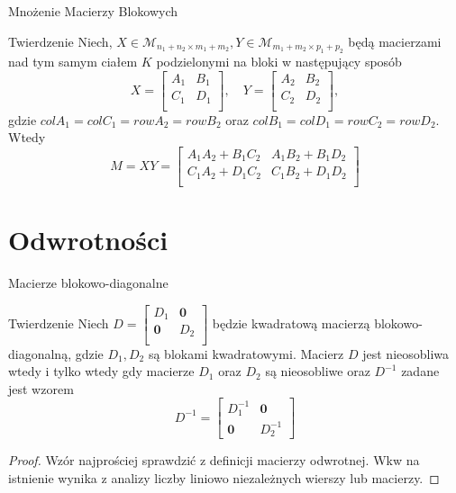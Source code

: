 \documentclass{beamer}
\newcommand{\zero}{\mathbf{0}}
\begin{document}
\begin{frame}{Mnożenie Macierzy Blokowych}
    \begin{block}{Twierdzenie}
        Niech, $X \in \mathcal{M}_{n_1 + n_2 \times m_1 + m_2},Y \in \mathcal{M}_{m_1 + m_2 \times p_1 + p_2}$ będą macierzami nad tym samym ciałem $K$ podzielonymi na bloki w następujący sposób
        $$X =\begin{bmatrix}
            A_1 & B_1 \\ C_1 & D_1 \\
        \end{bmatrix}, \quad Y = \begin{bmatrix}
            A_2 & B_2 \\ C_2 & D_2 \\ 
        \end{bmatrix},$$  gdzie $col A_1 = col C_1 = row A_2 = row B_2$ oraz $col B_1 = col D_1 = row C_2 = row D_2 .$
        \newline 
        Wtedy 
        $$ M = XY = \begin{bmatrix}
            A_1 A_2 +  B_1 C_2 & A_1 B_2 + B_1 D_2 \\
            C_1 A_2 + D_1 C_2 & C_1 B_2 + D_1 D_2 \\
        \end{bmatrix}$$
    \end{block}
\end{frame}

\section{Odwrotności}

\begin{frame}{Macierze blokowo-diagonalne}
    \begin{block}{Twierdzenie}
        Niech $D = \begin{bmatrix}
            D_1 & \zero \\ \zero & D_2 \\ 
        \end{bmatrix}$
        będzie kwadratową macierzą blokowo-diagonalną, gdzie $D_1, D_2$ są blokami kwadratowymi. Macierz $D$ jest nieosobliwa wtedy i tylko wtedy gdy macierze 
        $D_1$ oraz $D_2$ są nieosobliwe oraz $D^{-1}$ zadane jest wzorem
        $$ D^{-1} = \begin{bmatrix}
            D_{1}^{-1} & \zero \\ \zero & D_{2}^{-1}
        \end{bmatrix}$$
    \end{block}
    \pause 
    \begin{proof}
        Wzór najprościej sprawdzić z definicji macierzy odwrotnej. 
        Wkw na istnienie wynika z analizy liczby liniowo niezależnych wierszy lub macierzy. 
    \end{proof}
\end{frame}
\end{document}
